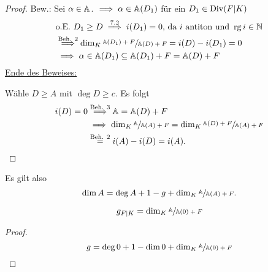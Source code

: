 \begin{proof}
    Bew.: Sei $\alpha \in \mathbb{A}$. $\implies \alpha \in \mathbb{A}(D_1)$ für ein $D_1 \in \operatorname{Div}(F|K)$
    \begin{align*}
        &\text{o.E. } D_1 \geq D \stackrel{7.2}{\implies} i(D_1) = 0 \text{, da } i \text{ antiton und } \operatorname{rg} i \in \mathbb{N}\\
        &\stackrel{\text{Beh. 2}}{\implies} \dim_K \sfrac{\mathbb{A}(D_1)+F}{\mathbb{A}(D) + F} = i(D)- i(D_1) = 0\\
        &\implies \alpha \in \mathbb{A}(D_1) \subseteq \mathbb{A}(D_1)+F = \mathbb{A}(D) +F
    \end{align*}
    \underline{Ende des Beweises:}
    
    Wähle $D \geq A$ mit $\deg D \geq c$. Es folgt
    \begin{align*}
        i(D) = 0 &\stackrel{\text{Beh. 3}}{\implies} \mathbb{A} = \mathbb{A}(D) + F\\
        & \implies \dim_K \sfrac{\mathbb{A}}{\mathbb{A}(A)+F} = \dim_K \sfrac{\mathbb{A}(D)+F}{\mathbb{A}(A)+F} \\
        & \overset{\text{Beh. 2}}{=} i(A) - i(D) = i(A).
    \end{align*}
\end{proof}

\begin{bemerkungnr}
    Es gilt also
    $$ \dim A = \deg A + 1 - g + \dim_K \sfrac{\mathbb{A}}{\mathbb{A}(A) + F}.$$
\end{bemerkungnr}

\begin{korollar}
    $$ g_{F|K} = \dim_K \sfrac{\mathbb{A}}{\mathbb{A}(0) + F}$$
\end{korollar}
\begin{proof}
    $$ g = \deg 0 + 1 - \dim 0 + \dim_K \sfrac{\mathbb{A}}{\mathbb{A}(0) + F}$$
\end{proof}

